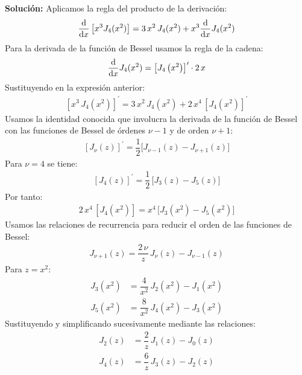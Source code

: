 \documentclass[hidelinks,12pt]{article}
\begin{document}
\begin{enumerate}[resume]
\noindent
\textbf{Solución: } Aplicamos la regla del producto de la derivación:
\begin{align*}
\dv{x} \left[ x^{3} J_{4}(x^{2}) \right] = 3 \, x^{2} \, J_{4}(x^{2}) + x^{3} \dv{x} J_{4}(x^{2})
\end{align*}
Para la derivada de la función de Bessel usamos la regla de la cadena:
\begin{align*}
\dv{x} J_{4}(x^{2}) = \left[ J_{4} \left( x^{2} \right) \right]^{\prime} \cdot 2 \, x
\end{align*}
Sustituyendo en la expresión anterior:
\begin{align*}
\left[ x^{3} \, J_{4} \left( x^{2} \right) \right]^{\prime} = 3 \, x^{2} \, J_{4} \left( x^{2} \right) + 2 \, x^{4} \,  \left[J_{4}\left( x^{2} \right) \right]^{\prime}
\end{align*}
Usamos la identidad conocida que involucra la derivada de la función de Bessel con las funciones de Bessel de órdenes $\nu - 1$ y de orden $\nu + 1$:
\begin{align*}
\left[ J_{\nu} (z) \right]^{\prime} = \dfrac{1}{2} \bigg[ J_{\nu-1} (z) - J_{\nu+1} (z) \bigg]
\end{align*}
Para $\nu = 4$ se tiene:
\begin{align*}
\left[ J_{4}(z) \right]^{\prime} = \dfrac{1}{2} \, \bigg[ J_{3} (z) - J_{5} (z) \bigg]
\end{align*}
Por tanto:
\begin{align*}
2 \, x^{4} \, \left[ J_{4} \left( x^{2} \right) \right]= x^{4} \, \bigg[ J_{3} \left( x^{2} \right) - J_{5} \left( x^{2} \right) \bigg]
\end{align*}
Usamos las relaciones de recurrencia para reducir el orden de las funciones de Bessel:
\begin{align*}
J_{\nu+1} (z) = \dfrac{2 \, \nu}{z} \, J_{\nu} (z) - J_{\nu-1} (z)
\end{align*}
Para $z = x^{2}$:
\begin{align*}
J_{3} \left( x^{2} \right) &= \dfrac{4}{x^{2}} \, J_{2} \left( x^{2} \right) - J_{1} \left( x^{2}\right) \\[0.5em]
J_{5} \left( x^{2} \right) &= \dfrac{8}{x^{2}} \, J_{4}\left( x^{2} \right) - J_{3} \left( x^{2} \right)
\end{align*}
Sustituyendo y simplificando sucesivamente mediante las relaciones:
\begin{align*}
J_{2}(z) &= \dfrac{2}{z} \, J_{1} (z) - J_{0} (z) \\[0.5em]
J_{4}(z) &= \dfrac{6}{z} \, J_{3} (z) - J_{2} (z)

\end{align*}
\end{enumerate}
\end{document}
